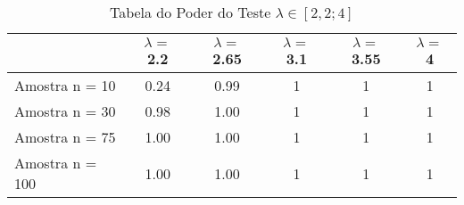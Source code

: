 \documentclass[11pt,]{article}
\begin{document}
\begin{table}[!h]

\caption{\label{tab:unnamed-chunk-7}Tabela do Poder do Teste $\lambda \in[2,2;4]$}
\centering
\begin{tabular}[t]{lccccc}
\toprule
  & $\lambda =$ 2.2 & $\lambda =$ 2.65 & $\lambda =$ 3.1 & $\lambda =$ 3.55 & $\lambda =$ 4\\
\midrule
Amostra n = 10 & 0.24 & 0.99 & 1 & 1 & 1\\
Amostra n = 30 & 0.98 & 1.00 & 1 & 1 & 1\\
Amostra n = 75 & 1.00 & 1.00 & 1 & 1 & 1\\
Amostra n = 100 & 1.00 & 1.00 & 1 & 1 & 1\\
\bottomrule
\end{tabular}
\end{table}
\end{document}
